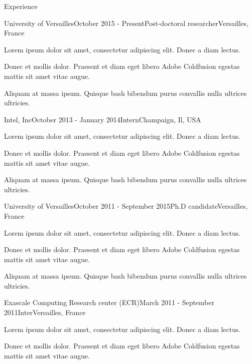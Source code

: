 \documentclass{resume} %
\begin{document}

\begin{rSection}{Experience}

\begin{rSubsection}{University of Versailles}{October 2015 - Present}{Post-doctoral researcher}{Versailles, France}
\item Lorem ipsum dolor sit amet, consectetur adipiscing elit. Donec a diam lectus.
\item Donec et mollis dolor. Praesent et diam eget libero Adobe Coldfusion egestas mattis sit amet vitae augue.
\item Aliquam at massa ipsum. Quisque bash bibendum purus convallis nulla ultrices ultricies.
\end{rSubsection}


\begin{rSubsection}{Intel, Inc}{October 2013 - January 2014}{Intern}{Champaign, Il, USA}
\item Lorem ipsum dolor sit amet, consectetur adipiscing elit. Donec a diam lectus.
\item Donec et mollis dolor. Praesent et diam eget libero Adobe Coldfusion egestas mattis sit amet vitae augue.
\item Aliquam at massa ipsum. Quisque bash bibendum purus convallis nulla ultrices ultricies.
\end{rSubsection}


\begin{rSubsection}{University of Versailles}{October 2011 - September 2015}{Ph.D candidate}{Versailles, France}
\item Lorem ipsum dolor sit amet, consectetur adipiscing elit. Donec a diam lectus.
\item Donec et mollis dolor. Praesent et diam eget libero Adobe Coldfusion egestas mattis sit amet vitae augue.
\item Aliquam at massa ipsum. Quisque bash bibendum purus convallis nulla ultrices ultricies.
\end{rSubsection}


\begin{rSubsection}{Exascale Computing Research center (ECR)}{March 2011 - September 2011}{Inter}{Versailles, France}
\item Lorem ipsum dolor sit amet, consectetur adipiscing elit. Donec a diam lectus.
\item Donec et mollis dolor. Praesent et diam eget libero Adobe Coldfusion egestas mattis sit amet vitae augue.
\end{rSubsection}



\end{rSection}
\end{document}
